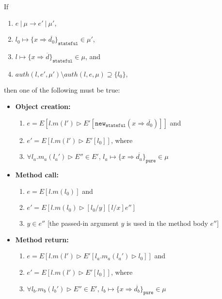 \documentclass{llncs}
\newcommand{\keywadj}[1]{\mathtt{#1}}
\newcommand{\intuition}[1]{#1}
\begin{document}
\begin{theorem} If
\begin{enumerate}
\item $e~|~\mu \longrightarrow e'~|~\mu'$,
\item $l_0 \mapsto \{ x \Rightarrow \overline{d_0} \}_{\keywadj{stateful}} \in \mu'$,
\item $l \mapsto \{ x \Rightarrow \overline{d} \}_{\keywadj{stateful}} \in \mu$, and
\item $auth(l, e', \mu') \setminus auth(l, e, \mu) \supseteq \{ l_0 \}$,
\end{enumerate}
then one of the following must be true:
\begin{itemize}
\item \textbf{Object creation:}
\begin{enumerate}
\item $e = E[l.m(l') \rhd E'[\keywadj{new}_{\keywadj{stateful}}(x \Rightarrow \overline{d_0})]]$ and
\item $e' = E[l.m(l') \rhd E'[l_0]]$, where
\item $\forall l_a.m_a(l_a') \rhd E'' \in E'$, $l_a \mapsto \{ x \Rightarrow \overline{d_a}\}_{\keywadj{pure}} \in \mu$ \intuition{}
\end{enumerate}

\item \textbf{Method call:}
\begin{enumerate}
\item $e = E[l.m(l_0)]$ and
\item $e' = E[l.m(l_0) \rhd [l_0/y][l/x]e'']$
\item $y \in e''$ \intuition{\hspace{100pt} [the passed-in argument $y$ is used in the method body $e''$]}
\end{enumerate}

\item \textbf{Method return:}
\begin{enumerate}
\item $e = E[l.m(l') \rhd E'[l_a.m_a(l_a') \rhd l_0]]$ and
\item $e' = E[l.m(l') \rhd E'[l_0]]$, where
\item $\forall l_b.m_b(l_b') \rhd E'' \in E'$, $l_b \mapsto \{ x \Rightarrow \overline{d_b}\}_{\keywadj{pure}} \in \mu$ \intuition{}
\end{enumerate}
\end{itemize}

\end{theorem}
\end{document}
